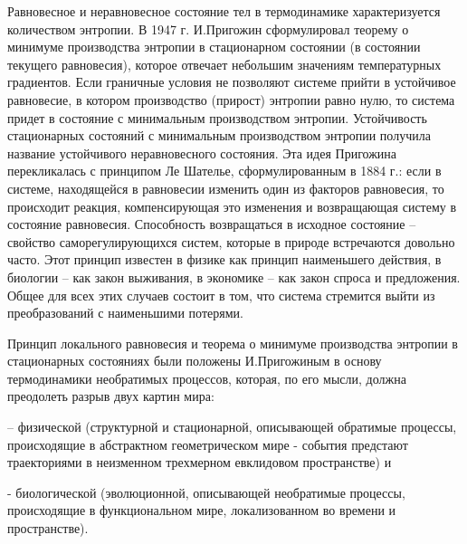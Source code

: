 \documentclass[exam_answers.tex]{subfiles}
\begin{document}
Равновесное и неравновесное состояние тел в термодинамике
характеризуется количеством энтропии. В 1947 г. И.Пригожин сформулировал
теорему о минимуме производства энтропии в стационарном состоянии (в
состоянии текущего равновесия), которое отвечает небольшим значениям
температурных градиентов. Если граничные условия не позволяют системе
прийти в устойчивое равновесие, в котором производство (прирост) энтропии
равно нулю, то система придет в состояние с минимальным производством
энтропии. Устойчивость стационарных состояний с минимальным
производством энтропии получила название устойчивого неравновесного
состояния. Эта идея Пригожина перекликалась с принципом Ле Шателье,
сформулированным в 1884 г.: если в системе, находящейся в равновесии
изменить один из факторов равновесия, то происходит реакция,
компенсирующая это изменения и возвращающая систему в состояние
равновесия. Способность возвращаться в исходное состояние – свойство
саморегулирующихся систем, которые в природе встречаются довольно часто.
Этот принцип известен в физике как принцип наименьшего действия, в
биологии – как закон выживания, в экономике – как закон спроса и
предложения. Общее для всех этих случаев состоит в том, что система
стремится выйти из преобразований с наименьшими потерями.

Принцип локального равновесия и теорема о минимуме производства
энтропии в стационарных состояниях были положены И.Пригожиным в основу
термодинамики необратимых процессов, которая, по его мысли, должна
преодолеть разрыв двух картин мира:

-- физической (структурной и стационарной, описывающей
обратимые процессы, происходящие в абстрактном геометрическом мире -
события предстают траекториями в неизменном трехмерном евклидовом
пространстве) и

- биологической (эволюционной, описывающей необратимые
процессы, происходящие в функциональном мире, локализованном во времени
и пространстве). 
\end{document}
